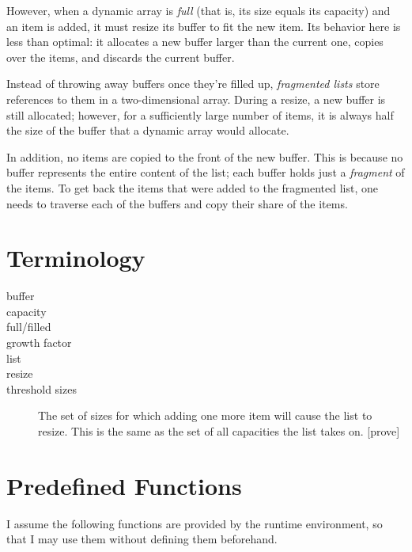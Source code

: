 \documentclass{article}
\begin{document}
	However, when a dynamic array is \textit{full} (that is, its size equals its capacity) and an item is added, it must resize its buffer to fit the new item. Its behavior here is less than optimal: it allocates a new buffer larger than the current one, copies over the items, and discards the current buffer.\par
	
	Instead of throwing away buffers once they're filled up, \textit{fragmented lists} store references to them in a two-dimensional array. During a resize, a new buffer is still allocated; however, for a sufficiently large number of items, it is always half the size of the buffer that a dynamic array would allocate.\par
	
	In addition, no items are copied to the front of the new buffer. This is because no buffer represents the entire content of the list; each buffer holds just a \textit{fragment} of the items. To get back the items that were added to the fragmented list, one needs to traverse each of the buffers and copy their share of the items.\par
	

	\section{Terminology}
	\label{Terminology}
	
	\begin{description}
		\item[buffer] %
		\item[capacity] %
		\item[full/filled] %
		\item[growth factor]
		\item[list] %
		\item[resize]
		\item[threshold sizes] The set of sizes for which adding one more item will cause the list to resize. This is the same as the set of all capacities the list takes on. [prove]
	\end{description}

	\section{Predefined Functions}
	\label{Predefined Functions}
	
	I assume the following functions are provided by the runtime environment, so that I may use them without defining them beforehand.\par
	
\end{document}
